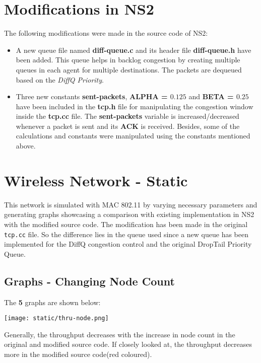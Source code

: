 \documentclass{article}
\begin{document}
 \section{Modifications in NS2}
 The following modifications were made in the source code of NS2:
 \begin{itemize}
     \item A new queue file named \textbf{diff-queue.c} and its header file \textbf{diff-queue.h} have been added. This queue helps in backlog congestion by creating multiple queues in each agent for multiple destinations. The packets are dequeued based on the \textit{DiffQ Priority}.
     \item Three new constants \textbf{sent-packets}, \textbf{ALPHA = $0.125$} and \textbf{BETA = $0.25$} have been included in the \textbf{tcp.h} file for manipulating the congestion window inside the \textbf{tcp.cc} file. The \textbf{sent-packets} variable is increased/decreased whenever a packet is sent and its \textbf{ACK} is received. Besides, some of the calculations and constants were manipulated using the constants mentioned above.
 \end{itemize}

\section{Wireless Network - Static}
This network is simulated with MAC 802.11 by varying necessary parameters and generating graphs showcasing a comparison with existing implementation in NS2 with the modified source code. The modification has been made in the original \texttt{tcp.cc} file. So the difference lies in the queue used since a new queue has been implemented for the DiffQ congestion control and the original DropTail Priority Queue.

\subsection{Graphs - Changing Node Count}
The \textbf{5} graphs are shown below:

\begin{center}
    \texttt{[image: static/thru-node.png]}
\end{center}

Generally, the throughput decreases with the increase in node count in the original and modified source code. If closely looked at, the throughput decreases more in the modified source code(red coloured).
\end{document}
